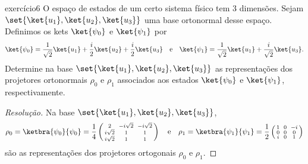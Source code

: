 \begin{exercício}{}{exercício6}
    O espaço de estados de um certo sistema físico tem 3 dimensões. Sejam \(\set{\ket{u_1}, \ket{u_2}, \ket{u_3}}\) uma base ortonormal desse espaço. Definimos os kets \(\ket{\psi_0}\) e \(\ket{\psi_1}\) por
    \begin{equation*}
        \ket{\psi_0} = \frac{1}{\sqrt{2}} \ket{u_1} +\frac{i}{2} \ket{u_2} + \frac{i}{2}\ket{u_3}
        \quad\text{e}\quad
        \ket{\psi_1} = \frac{1}{\sqrt{2}} \ket{u_1} + \frac{i}{\sqrt{2}}\ket{u_3}.
    \end{equation*}
    Determine na base \(\set{\ket{u_1}, \ket{u_2}, \ket{u_3}}\) as representações dos projetores ortonormais \(\rho_0\) e \(\rho_1\) associados aos estados \(\ket{\psi_0}\) e \(\ket{\psi_1}\), respectivamente.
\end{exercício}
\begin{proof}[Resolução]
    Na base \(\set{\ket{u_1}, \ket{u_2}, \ket{u_3}}\),
    \begin{equation*}
        \rho_0 = \ketbra{\psi_0}{\psi_0} = \frac14\left(\begin{smallmatrix}
                2 && -i\sqrt{2} && -i\sqrt{2}\\
                i\sqrt{2} && 1 && 1\\
                i\sqrt{2} && 1 && 1
        \end{smallmatrix}\right)
        \quad\text{e}\quad
        \rho_1 = \ketbra{\psi_1}{\psi_1} = \frac12\left(\begin{smallmatrix}
                1 && 0 && -i\\
                0 && 0 && 0\\
                i && 0 && 1
        \end{smallmatrix}\right)
    \end{equation*}
    são as representações dos projetores ortogonais \(\rho_0\) e \(\rho_1\).
\end{proof}
